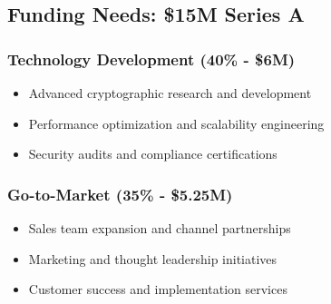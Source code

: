 \documentclass[12pt,a4paper]{article}
\begin{document}
\subsection{Funding Needs: \$15M Series A}

\begin{center}
\end{center}

\subsubsection{Technology Development (40\% - \$6M)}
\begin{itemize}
    \item Advanced cryptographic research and development
    \item Performance optimization and scalability engineering
    \item Security audits and compliance certifications
\end{itemize}

\subsubsection{Go-to-Market (35\% - \$5.25M)}
\begin{itemize}
    \item Sales team expansion and channel partnerships
    \item Marketing and thought leadership initiatives
    \item Customer success and implementation services
\end{itemize}
\end{document}
